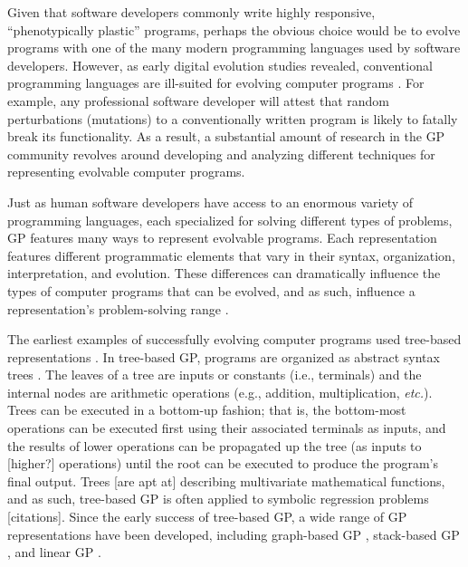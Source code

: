 Given that software developers commonly write highly responsive, ``phenotypically plastic'' programs, perhaps the obvious choice would be to evolve programs with one of the many modern programming languages used by software developers.
However, as early digital evolution studies revealed, conventional programming languages are ill-suited for evolving computer programs \citep{rasmussen_core_1989}.
For example, any professional software developer will attest that random perturbations (mutations) to a conventionally written program is likely to fatally break its functionality. %
As a result, a substantial amount of research in the GP community revolves around developing and analyzing different techniques for representing evolvable computer programs.

Just as human software developers have access to an enormous variety of programming languages, each specialized for solving different types of problems, GP features many ways to represent evolvable programs.
Each representation features different programmatic elements that vary in their syntax, organization, interpretation, and evolution.
These differences can dramatically influence the types of computer programs that can be evolved, and as such, influence a representation's problem-solving range \citep{hintze_buffet_2019,wilson_comparison_2008}. 


The earliest examples of successfully evolving computer programs used tree-based representations \citep{forsyth_beagle_1981,koza_hierarchical_1989}.
In tree-based GP, programs are organized as abstract syntax trees \citep{poli_field_2008}.
The leaves of a tree are inputs or constants (i.e., terminals) and the internal nodes are arithmetic operations (e.g., addition, multiplication, \textit{etc.}).
Trees can be executed in a bottom-up fashion; that is, the bottom-most operations can be executed first using their associated terminals as inputs, and the results of lower operations can be propagated up the tree (as inputs to [higher?] operations) until the root can be executed to produce the program's final output. 
Trees [are apt at] describing multivariate mathematical functions, and as such, tree-based GP is often applied to symbolic regression problems [citations]. 
Since the early success of tree-based GP, a wide range of GP representations have been developed, including graph-based GP \citep{miller_empirical_1999,kelly_multi-task_2017}, stack-based GP \citep{perkis_stack-based_1994,spector_autoconstructive_2001}, and linear GP \citep{brameier_linear_2007}. 

